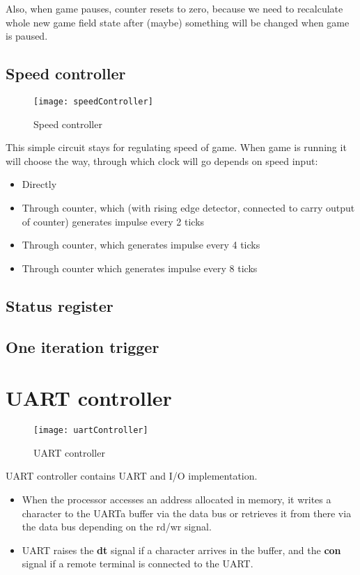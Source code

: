 Also, when game pauses, counter resets to zero, because we need to recalculate whole new game field state after (maybe) something will be changed when game is paused. 

\clearpage
\subsection*{Speed controller}

\begin{figure}[ht]
	\centering
	\texttt{[image: speedController]}
	\caption{Speed controller}
\end{figure}

This simple circuit stays for regulating speed of game. When game is running it will choose the way, through which clock will go depends on speed input:

\begin{itemize}
	\item Directly 
	\item Through counter, which (with rising edge detector, connected to carry output of counter) generates impulse every 2 ticks
	\item Through counter, which generates impulse every 4 ticks
	\item Through counter which generates impulse every 8 ticks
\end{itemize}

\subsection*{Status register}

\subsection*{One iteration trigger}

\section*{UART controller}

\begin{figure}[ht]
	\centering
	\texttt{[image: uartController]}
	\caption{UART controller}
\end{figure}

UART controller contains UART and I/O implementation.

\begin{itemize}
	\item When the processor accesses an address allocated in memory, it writes a character to the UARTa buffer via the data bus or retrieves it from there via the data bus depending on the rd/wr signal.
	\item UART raises the \textbf{dt} signal if a character arrives in the buffer, and the \textbf{con} signal if a remote terminal is connected to the UART.
\end{itemize}
